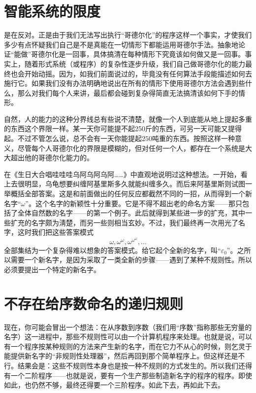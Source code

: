\section{智能系统的限度}

是在反对。正是由于我们无法写出执行“哥德尔化”的程序这样一个事实，才使我们多少有点怀疑我们自己是不是真能在一切情形下都能运用哥德尔手法。抽象地论证“能做”哥德尔化是一回事，具体搞清在每种情形下究竟该如何做又是一回事。事实上，随着形式系统（或程序）的复杂性逐步升级，我们自己做哥德尔化的能力最终也会开始动摇。因为，如我们前面说过的，毕竟没有任何算法手段能描述如何去施行它。如果我们没有办法明确地说出在所有的情形下使用哥德尔方法会遇到些什么，那么对我们每个人来讲，最后都会碰到复杂得简直无法搞清该如何下手的情形。

自然，人的能力的这种分界线总有些说不清楚，就像一个人到底能从地上提起多重的东西这个界限一样。某一天你可能提不起250斤的东西，可另一天可能又提得起。不过不管怎么说，总不会有一天你能提起$250$吨重的东西。按照这样一种意义，尽管每个人哥德尔化的界限是模糊的，但对任何一个人，都存在一个系统是大大超出他的哥德尔化能力的。

在《生日大合唱哇哇哇乌阿乌阿乌阿……》中直观地说明过这种想法。一开始，看上去很明显，乌龟想要纠缠阿基里斯多久就能纠缠多久。而后来阿基里斯则试图一举概括全部答案。这是和前面做出的任何反应都截然不同的一招，从而得到一个新名字“$\omega$”。这个名字的新颖性十分重要。它是不得不超出老的命名方案——那只包括了全体自然数的名字——的第一个例子。此后就得到某些进一步的扩充，其中一些扩充的名字颇为淸楚，而另一些则相当玄妙。不过，我们最终再一次用光了名字，这时我们把这些答案模式
\[
\omega, \omega^\omega, \omega^{\omega^\omega},\dotsc
\]
全部集结为一个复杂得难以想象的答案模式。给它起个全新的名字，叫“$\varepsilon_0$”。之所以需要一个新名字，是因为采取了一类全新的步骤——遇到了某种不规则性。所以必须要提出一个特定的新名字。

\section{不存在给序数命名的递归规则}

现在，你可能会冒出一个想法：在从序数到序数（我们用“序数”指称那些无穷量的名字）这一进程中，那些不规则性可以由一个计算机程序来处理。也就是说，可以有一个程序按某种规则的方法来产生新的名字，而在它力不从心的时候，则乞灵于能提供新名字的“非规则性处理器”，然后再回到那个简单程序上。但这样还是不行。结果会是：这些不规则性本身也是按一种不规则的方式发生的。所以我们还得有一个二阶程序——也就是说，要有一个生产那些制造新名字的程序的程序。即使如此，也仍然不够，最终还得要一个三阶程序。如此下去，再如此下去。


